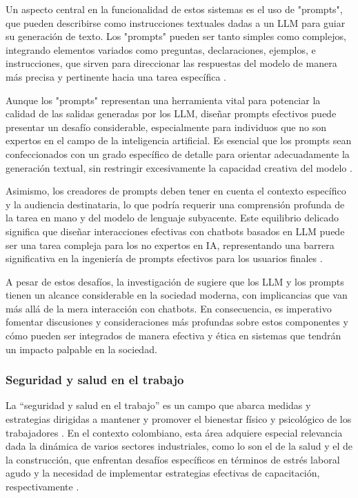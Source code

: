Un aspecto central en la funcionalidad de estos sistemas es el uso de "prompts", que pueden describirse como instrucciones textuales dadas a un LLM para guiar su generación de texto. Los "prompts" pueden ser tanto simples como complejos, integrando elementos variados como preguntas, declaraciones, ejemplos, e instrucciones, que sirven para direccionar las respuestas del modelo de manera más precisa y pertinente hacia una tarea específica \citep{Zamfirescu-Pereira2023WhyPrompts}.

Aunque los "prompts" representan una herramienta vital para potenciar la calidad de las salidas generadas por los LLM, diseñar prompts efectivos puede presentar un desafío considerable, especialmente para individuos que no son expertos en el campo de la inteligencia artificial. Es esencial que los prompts sean confeccionados con un grado específico de detalle para orientar adecuadamente la generación textual, sin restringir excesivamente la capacidad creativa del modelo \citep{Zamfirescu-Pereira2023WhyPrompts}.

Asimismo, los creadores de prompts deben tener en cuenta el contexto específico y la audiencia destinataria, lo que podría requerir una comprensión profunda de la tarea en mano y del modelo de lenguaje subyacente. Este equilibrio delicado significa que diseñar interacciones efectivas con chatbots basados en LLM puede ser una tarea compleja para los no expertos en IA, representando una barrera significativa en la ingeniería de prompts efectivos para los usuarios finales \citep{Zamfirescu-Pereira2023WhyPrompts}.

A pesar de estos desafíos, la investigación de \citet{Zamfirescu-Pereira2023WhyPrompts} sugiere que los LLM y los prompts tienen un alcance considerable en la sociedad moderna, con implicancias que van más allá de la mera interacción con chatbots. En consecuencia, es imperativo fomentar discusiones y consideraciones más profundas sobre estos componentes y cómo pueden ser integrados de manera efectiva y ética en sistemas que tendrán un impacto palpable en la sociedad.


\subsubsection{Seguridad y salud en el trabajo}
La ``seguridad y salud en el trabajo'' es un campo que abarca medidas y estrategias dirigidas a mantener y promover el bienestar físico y psicológico de los trabajadores \citep{Yaneth2021StrategiesSector,GonzalezDelgado2023AcuteStudy}. En el contexto colombiano, esta área adquiere especial relevancia dada la dinámica de varios sectores industriales, como lo son el de la salud y el de la construcción, que enfrentan desafíos específicos en términos de estrés laboral agudo y la necesidad de implementar estrategias efectivas de capacitación, respectivamente \citep{Yaneth2021StrategiesSector,GonzalezDelgado2023AcuteStudy}.

